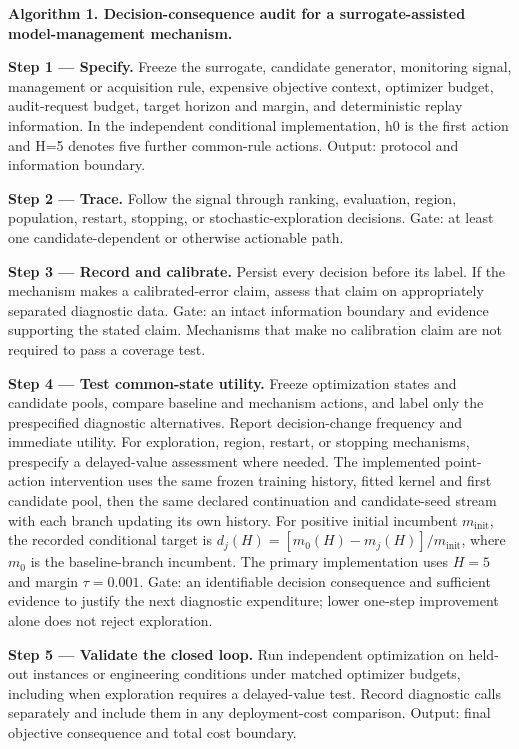 \documentclass[]{interact}
\begin{document}
\textbf{Algorithm 1. Decision-consequence audit for a surrogate-assisted model-management mechanism.}

\textbf{Step 1 --- Specify.} Freeze the surrogate, candidate generator, monitoring signal, management or acquisition rule, expensive objective context, optimizer budget, audit-request budget, target horizon and margin, and deterministic replay information. In the independent conditional implementation, h0 is the first action and H=5 denotes five further common-rule actions. Output: protocol and information boundary.

\textbf{Step 2 --- Trace.} Follow the signal through ranking, evaluation, region, population, restart, stopping, or stochastic-exploration decisions. Gate: at least one candidate-dependent or otherwise actionable path.

\textbf{Step 3 --- Record and calibrate.} Persist every decision before its label. If the mechanism makes a calibrated-error claim, assess that claim on appropriately separated diagnostic data. Gate: an intact information boundary and evidence supporting the stated claim. Mechanisms that make no calibration claim are not required to pass a coverage test.

\textbf{Step 4 --- Test common-state utility.} Freeze optimization states and candidate pools, compare baseline and mechanism actions, and label only the prespecified diagnostic alternatives. Report decision-change frequency and immediate utility. For exploration, region, restart, or stopping mechanisms, prespecify a delayed-value assessment where needed. The implemented point-action intervention uses the same frozen training history, fitted kernel and first candidate pool, then the same declared continuation and candidate-seed stream with each branch updating its own history. For positive initial incumbent $m_{\mathrm{init}}$, the recorded conditional target is $d_j(H)=[m_0(H)-m_j(H)]/m_{\mathrm{init}}$, where $m_0$ is the baseline-branch incumbent. The primary implementation uses $H=5$ and margin $\tau=0.001$. Gate: an identifiable decision consequence and sufficient evidence to justify the next diagnostic expenditure; lower one-step improvement alone does not reject exploration.

\textbf{Step 5 --- Validate the closed loop.} Run independent optimization on held-out instances or engineering conditions under matched optimizer budgets, including when exploration requires a delayed-value test. Record diagnostic calls separately and include them in any deployment-cost comparison. Output: final objective consequence and total cost boundary.
\end{document}
